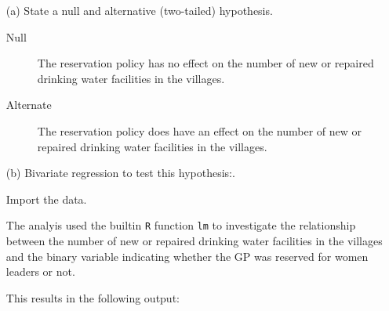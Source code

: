 \documentclass[12pt,letterpaper]{article}
\begin{document}
\newpage
\begin{enumerate}
	\item [(a)] State a null and alternative (two-tailed) hypothesis. 
	
	\begin{description}
	  \item [Null] The reservation policy has no effect on the number of new or 
	  repaired drinking water facilities in the villages.
	  \item [Alternate] The reservation policy does have an effect on the number of new or 
	  repaired drinking water facilities in the villages.
	\end{description}
	

	
	\item [(b)] Bivariate regression to test this hypothesis:.

  Import the data.
	  
	
  The analyis used  the builtin \texttt{R} function \texttt{lm} to investigate the 
  relationship 	between the number of new or repaired drinking water facilities in 
  the villages and the binary variable indicating whether the GP was reserved for 
  women leaders or not.

	  
	
	
	This results in the following output:
	

\end{enumerate}
\end{document}
